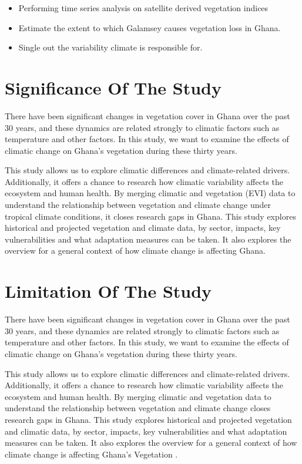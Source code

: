 \begin{itemize}
	\item Performing time series analysis on satellite derived vegetation indices
	
	\item Estimate the extent to which Galamsey causes vegetation loss in Ghana.
	
	\item Single out the variability climate is responsible for.
\end{itemize}

\section{Significance Of The Study}

There have been significant changes in vegetation cover in Ghana over the past 30 years, and these dynamics are related strongly to climatic factors such as temperature and other factors. In this study, we want to examine the effects of climatic change on Ghana's vegetation during these thirty years.

This study allows us to explore climatic differences and climate-related drivers. Additionally, it offers a chance to research how climatic variability affects the ecosystem and human health. By merging climatic and vegetation (EVI) data to understand the relationship between vegetation and climate change under tropical climate conditions, it closes research gaps in Ghana. This study explores historical and projected vegetation and climate data, by sector, impacts, key vulnerabilities and what adaptation measures can be taken. It also explores the overview for a general context of how climate change is affecting Ghana.

\section{Limitation Of The Study}

There have been significant changes in vegetation cover in Ghana over the past 30 years, and these dynamics are related strongly to climatic factors such as temperature and other factors. In this study, we want to examine the effects of climatic change on Ghana's vegetation during these thirty years.

This study allows us to explore climatic differences and climate-related drivers. Additionally, it offers a chance to research how climatic variability affects the ecosystem and human health. By merging climatic and vegetation data to understand the relationship between vegetation and climate change closes research gaps in Ghana. This study explores historical and projected vegetation and climatic data, by sector, impacts, key vulnerabilities and what adaptation measures can be taken. It also explores the overview for a general context of how climate change is affecting Ghana's Vegetation .